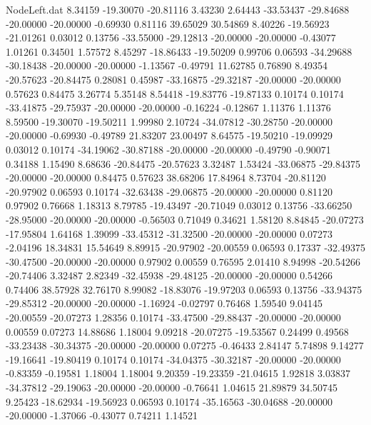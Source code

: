\begin{filecontents}{NodeLeft.dat}
   8.34159  -19.30070  -20.81116     3.43230    2.64443  -33.53437  -29.84688  -20.00000  -20.00000   -0.69930    0.81116   39.65029   30.54869
   8.40226  -19.56923  -21.01261     0.03012    0.13756  -33.55000  -29.12813  -20.00000  -20.00000   -0.43077    1.01261    0.34501    1.57572
   8.45297  -18.86433  -19.50209     0.99706    0.06593  -34.29688  -30.18438  -20.00000  -20.00000   -1.13567   -0.49791   11.62785    0.76890
   8.49354  -20.57623  -20.84475     0.28081    0.45987  -33.16875  -29.32187  -20.00000  -20.00000    0.57623    0.84475    3.26774    5.35148
   8.54418  -19.83776  -19.87133     0.10174    0.10174  -33.41875  -29.75937  -20.00000  -20.00000   -0.16224   -0.12867    1.11376    1.11376
   8.59500  -19.30070  -19.50211     1.99980    2.10724  -34.07812  -30.28750  -20.00000  -20.00000   -0.69930   -0.49789   21.83207   23.00497
   8.64575  -19.50210  -19.09929     0.03012    0.10174  -34.19062  -30.87188  -20.00000  -20.00000   -0.49790   -0.90071    0.34188    1.15490
   8.68636  -20.84475  -20.57623     3.32487    1.53424  -33.06875  -29.84375  -20.00000  -20.00000    0.84475    0.57623   38.68206   17.84964
   8.73704  -20.81120  -20.97902     0.06593    0.10174  -32.63438  -29.06875  -20.00000  -20.00000    0.81120    0.97902    0.76668    1.18313
   8.79785  -19.43497  -20.71049     0.03012    0.13756  -33.66250  -28.95000  -20.00000  -20.00000   -0.56503    0.71049    0.34621    1.58120
   8.84845  -20.07273  -17.95804     1.64168    1.39099  -33.45312  -31.32500  -20.00000  -20.00000    0.07273   -2.04196   18.34831   15.54649
   8.89915  -20.97902  -20.00559     0.06593    0.17337  -32.49375  -30.47500  -20.00000  -20.00000    0.97902    0.00559    0.76595    2.01410
   8.94998  -20.54266  -20.74406     3.32487    2.82349  -32.45938  -29.48125  -20.00000  -20.00000    0.54266    0.74406   38.57928   32.76170
   8.99082  -18.83076  -19.97203     0.06593    0.13756  -33.94375  -29.85312  -20.00000  -20.00000   -1.16924   -0.02797    0.76468    1.59540
   9.04145  -20.00559  -20.07273     1.28356    0.10174  -33.47500  -29.88437  -20.00000  -20.00000    0.00559    0.07273   14.88686    1.18004
   9.09218  -20.07275  -19.53567     0.24499    0.49568  -33.23438  -30.34375  -20.00000  -20.00000    0.07275   -0.46433    2.84147    5.74898
   9.14277  -19.16641  -19.80419     0.10174    0.10174  -34.04375  -30.32187  -20.00000  -20.00000   -0.83359   -0.19581    1.18004    1.18004
   9.20359  -19.23359  -21.04615     1.92818    3.03837  -34.37812  -29.19063  -20.00000  -20.00000   -0.76641    1.04615   21.89879   34.50745
   9.25423  -18.62934  -19.56923     0.06593    0.10174  -35.16563  -30.04688  -20.00000  -20.00000   -1.37066   -0.43077    0.74211    1.14521

\end{filecontents}

